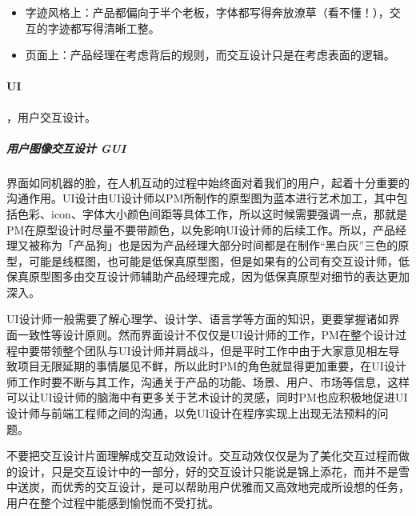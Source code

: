 \documentclass[letterpaper,10pt,english]{sphinxmanual}
\begin{document}
\begin{itemize}
\item {} 
字迹风格上：产品都偏向于半个老板，字体都写得奔放潦草（看不懂！），交互的字迹都写得清晰工整。

\item {} 
页面上：产品经理在考虑背后的规则，而交互设计只是在考虑表面的逻辑。%
\begin{footnote}[629]\sphinxAtStartFootnote
{}
%
\end{footnote}

\end{itemize}


\paragraph{UI}
\label{\detokenize{chapter_knowledge/IXD_design:ui}}
，用户交互设计。


\subparagraph{用户图像交互设计 GUI}
\label{\detokenize{chapter_knowledge/IXD_design:gui}}
界面如同机器的脸，在人机互动的过程中始终面对着我们的用户，起着十分重要的沟通作用。UI设计由UI设计师以PM所制作的原型图为蓝本进行艺术加工，其中包括色彩、icon、字体大小颜色间距等具体工作，所以这时候需要强调一点，那就是PM在原型设计时尽量不要带颜色，以免影响UI设计师的后续工作。所以，产品经理又被称为「产品狗」也是因为产品经理大部分时间都是在制作“黑白灰”三色的原型，可能是线框图，也可能是低保真原型图，但是如果有的公司有交互设计师，低保真原型图多由交互设计师辅助产品经理完成，因为低保真原型对细节的表达更加深入。

UI设计师一般需要了解心理学、设计学、语言学等方面的知识，更要掌握诸如界面一致性等设计原则。然而界面设计不仅仅是UI设计师的工作，PM在整个设计过程中要带领整个团队与UI设计师并肩战斗，但是平时工作中由于大家意见相左导致项目无限延期的事情屡见不鲜，所以此时PM的角色就显得更加重要，在UI设计师工作时要不断与其工作，沟通关于产品的功能、场景、用户、市场等信息，这样可以让UI设计师的脑海中有更多关于艺术设计的灵感，同时PM也应积极地促进UI设计师与前端工程师之间的沟通，以免UI设计在程序实现上出现无法预料的问题。%
\begin{footnote}[630]\sphinxAtStartFootnote
{}
%
\end{footnote}

不要把交互设计片面理解成交互动效设计。交互动效仅仅是为了美化交互过程而做的设计，只是交互设计中的一部分，好的交互设计只能说是锦上添花，而并不是雪中送炭，而优秀的交互设计，是可以帮助用户优雅而又高效地完成所设想的任务，用户在整个过程中能感到愉悦而不受打扰。
\end{document}
